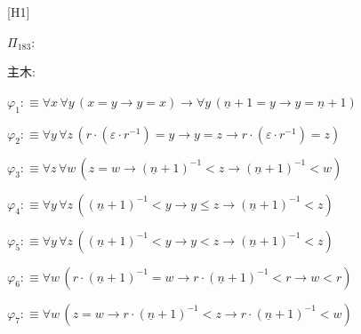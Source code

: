 \begin{fullproof}{[H1]}
\begin{ptree}
\end{ptree}
\noindent$\Pi_{183}$:
\begin{ptree}
\noLine
{}
\noLine
{}
\end{ptree}
\noindent 主木:
\begin{ptree}
\noLine
{}
\end{ptree}
\begin{abbrevlist}
\item $\varphi_{1} :\equiv \forall x\,\forall y\,(x = y \to y = x) \to \forall y\,(\underline{n} + 1 = y \to y = \underline{n} + 1)$
\item $\varphi_{2} :\equiv \forall y\,\forall z\,(r \cdot (\varepsilon \cdot r^{-1}) = y \to y = z \to r \cdot (\varepsilon \cdot r^{-1}) = z)$
\item $\varphi_{3} :\equiv \forall z\,\forall w\,(z = w \to (\underline{n} + 1)^{-1} < z \to (\underline{n} + 1)^{-1} < w)$
\item $\varphi_{4} :\equiv \forall y\,\forall z\,((\underline{n} + 1)^{-1} < y \to y \leq z \to (\underline{n} + 1)^{-1} < z)$
\item $\varphi_{5} :\equiv \forall y\,\forall z\,((\underline{n} + 1)^{-1} < y \to y < z \to (\underline{n} + 1)^{-1} < z)$
\item $\varphi_{6} :\equiv \forall w\,(r \cdot (\underline{n} + 1)^{-1} = w \to r \cdot (\underline{n} + 1)^{-1} < r \to w < r)$
\item $\varphi_{7} :\equiv \forall w\,(z = w \to r \cdot (\underline{n} + 1)^{-1} < z \to r \cdot (\underline{n} + 1)^{-1} < w)$

\end{abbrevlist}
\end{fullproof}
